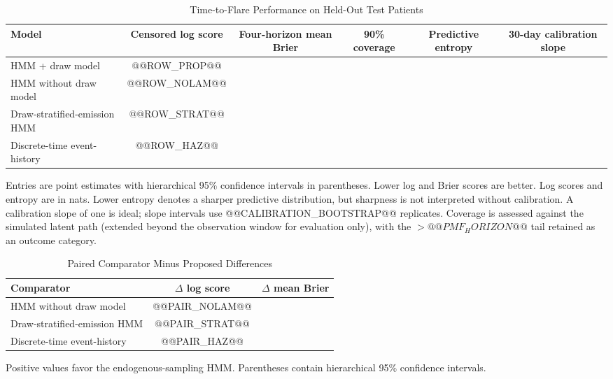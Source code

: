 \documentclass{ieeeaccess}
\begin{document}
\begin{table}[t]
\caption{Time-to-Flare Performance on Held-Out Test Patients}
\label{tab:mainresults}
\centering
\footnotesize
\setlength{\tabcolsep}{4.2pt}
\begin{tabular}{lccccc}
\toprule
Model & Censored log score & Four-horizon mean Brier & 90\% coverage & Predictive entropy & 30-day calibration slope\\
\midrule
HMM + draw model & @@ROW_PROP@@\\
HMM without draw model & @@ROW_NOLAM@@\\
Draw-stratified-emission HMM & @@ROW_STRAT@@\\
Discrete-time event-history & @@ROW_HAZ@@\\
\bottomrule
\end{tabular}
\begin{flushleft}\scriptsize
Entries are point estimates with hierarchical 95\% confidence intervals in parentheses. Lower log and Brier scores are better. Log scores and entropy are in nats. Lower entropy denotes a sharper predictive distribution, but sharpness is not interpreted without calibration. A calibration slope of one is ideal; slope intervals use @@CALIBRATION_BOOTSTRAP@@ replicates. Coverage is assessed against the simulated latent path (extended beyond the observation window for evaluation only), with the ${>}@@PMF_HORIZON@@$ tail retained as an outcome category.
\end{flushleft}
\end{table}

\begin{table}[t]
\caption{Paired Comparator Minus Proposed Differences}
\label{tab:paired}
\centering
\footnotesize
\setlength{\tabcolsep}{3.0pt}
\begin{tabular}{lcc}
\toprule
Comparator & $\Delta$ log score & $\Delta$ mean Brier\\
\midrule
HMM without draw model & @@PAIR_NOLAM@@\\
Draw-stratified-emission HMM & @@PAIR_STRAT@@\\
Discrete-time event-history & @@PAIR_HAZ@@\\
\bottomrule
\end{tabular}
\begin{flushleft}\scriptsize Positive values favor the endogenous-sampling HMM. Parentheses contain hierarchical 95\% confidence intervals.\end{flushleft}
\end{table}
\end{document}
